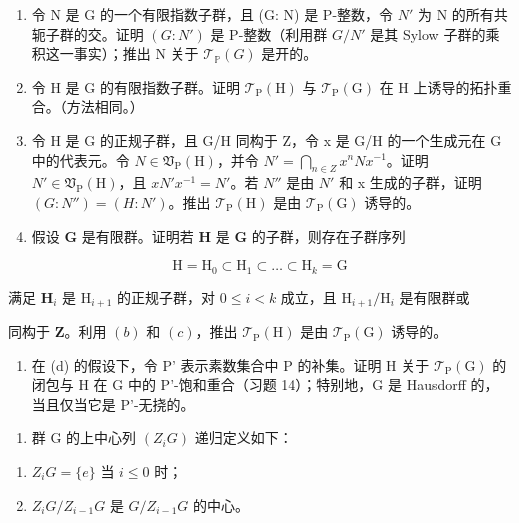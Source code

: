 \begin{enumerate}
\def\labelenumi{(\alph{enumi})}
\item
  令 N 是 G 的一个有限指数子群，且 (G: N) 是 P-整数，令 \(N'\) 为 N 的所有共轭子群的交。证明 \((G: N')\) 是 P-整数（利用群 \(G/N'\) 是其 Sylow 子群的乘积这一事实）；推出 N 关于 \(\mathcal{T}_{\mathbb{P}}(G)\) 是开的。
\item
  令 H 是 G 的有限指数子群。证明 \(\mathcal{T}_{\mathrm{P}}(\mathrm{H})\) 与 \(\mathcal{T}_{\mathrm{P}}(\mathrm{G})\) 在 H 上诱导的拓扑重合。（方法相同。）
\item
  令 H 是 G 的正规子群，且 G/H 同构于 Z，令 x 是 G/H 的一个生成元在 G 中的代表元。令 \(N \in \mathfrak{V}_{\mathrm{P}}(\mathrm{H})\)，并令 \(N' = \bigcap_{n \in Z} x^{n} N x^{-1}\)。证明 \(N' \in \mathfrak{V}_{\mathrm{P}}(\mathrm{H})\)，且 \(x N' x^{-1} = N'\)。若 \(N''\) 是由 \(N'\) 和 x 生成的子群，证明 \((G: N'') = (H: N')\)。推出 \(\mathcal{T}_{\mathrm{P}}(\mathrm{H})\) 是由 \(\mathcal{T}_{\mathrm{P}}(\mathrm{G})\) 诱导的。
\item
  假设 \(\mathbf{G}\) 是有限群。证明若 \(\mathbf{H}\) 是 \(\mathbf{G}\) 的子群，则存在子群序列
\end{enumerate}

\[
\mathrm{H} = \mathrm{H} _ {0} \subset \mathrm{H} _ {1} \subset \dots \subset \mathrm{H} _ {k} = \mathrm{G}
\]

满足 \(\mathbf{H}_i\) 是 \(\mathrm{H}_{i + 1}\) 的正规子群，对 \(0\leqslant i < k\) 成立，且 \(\mathrm{H}_{i + 1} / \mathrm{H}_i\) 是有限群或

同构于 \(\mathbf{Z}\)。利用 \((b)\) 和 \((c)\)，推出 \(\mathcal{T}_{\mathrm{P}}(\mathrm{H})\) 是由 \(\mathcal{T}_{\mathrm{P}}(\mathrm{G})\) 诱导的。

\begin{enumerate}
\def\labelenumi{(\alph{enumi})}
\setcounter{enumi}{4}
\tightlist
\item
  在 (d) 的假设下，令 P' 表示素数集合中 P 的补集。证明 H 关于 \(\mathcal{T}_{\mathrm{P}}(\mathrm{G})\) 的闭包与 H 在 G 中的 P'-饱和重合（习题 14）；特别地，G 是 Hausdorff 的，当且仅当它是 P'-无挠的。
\end{enumerate}

\begin{enumerate}
\def\labelenumi{\arabic{enumi}.}
\setcounter{enumi}{17}
\tightlist
\item
  群 G 的上中心列 \((Z_{i}G)\) 递归定义如下：
\end{enumerate}

\begin{enumerate}
\def\labelenumi{(\roman{enumi})}
\item
  \(Z_{i}G = \{e\}\) 当 \(i \leqslant 0\) 时；
\item
  \(Z_{i}G/Z_{i-1}G\) 是 \(G/Z_{i-1}G\) 的中心。
\end{enumerate}

